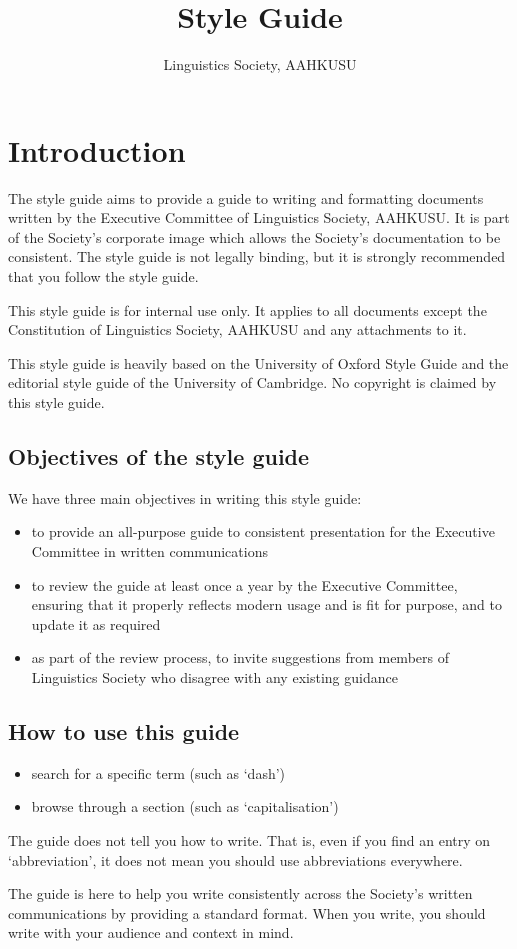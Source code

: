 \documentclass[11pt,a4paper]{book}
\author{Linguistics Society, AAHKUSU}
\title{\firasans Style Guide}
\begin{document}
	\maketitle
	
	\frontmatter
	\tableofcontents
	
	\mainmatter
	\chapter{Introduction}
	The style guide aims to provide a guide to writing and formatting documents written by the Executive Committee of Linguistics Society, AAHKUSU. It is part of the Society's corporate image which allows the Society's documentation to be consistent. The style guide is not legally binding, but it is strongly recommended that you follow the style guide. \par
	This style guide is for internal use only. It applies to all documents except the Constitution of Linguistics Society, AAHKUSU and any attachments to it. \par
	This style guide is heavily based on the University of Oxford Style Guide and the editorial style guide of the University of Cambridge. No copyright is claimed by this style guide. \par
	\section{Objectives of the style guide}
	We have three main objectives in writing this style guide:
		\begin{itemize}
			\item to provide an all-purpose guide to consistent presentation for the Executive Committee in written communications
			\item to review the guide at least once a year by the Executive Committee, ensuring that it properly reflects modern usage and is fit for purpose, and to update it as required
			\item as part of the review process, to invite suggestions from members of Linguistics Society who disagree with any existing guidance
		\end{itemize}
	\section{How to use this guide}
		\begin{itemize}
			\item search for a specific term (such as `dash')
			\item browse through a section (such as `capitalisation')
		\end{itemize}
	The guide does not tell you how to write. That is, even if you find an entry on `abbreviation', it does not mean you should use abbreviations everywhere. \par
	The guide is here to help you write consistently across the Society's written communications by providing a standard format. When you write, you should write with your audience and context in mind.
\end{document}

